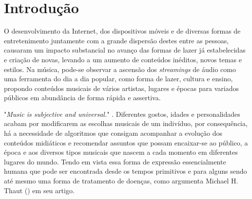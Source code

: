 \documentclass[12pt, %
openright, 
oneside, %
a4paper,    %
brazil]{facom-ufu-abntex2}
\begin{document}

\tableofcontents*
\cleardoublepage





\textual



\chapter[Introdução]{Introdução}


O desenvolvimento da Internet, dos dispositivos móveis e de diversas formas de entretenimento juntamente com a grande dispersão destes entre as pessoas, causaram um impacto substancial no avanço das formas de lazer já estabelecidas e criação de novas, levando a um aumento de conteúdos inéditos, novos temas e estilos. Na música, pode-se observar a ascensão dos \textit{streamings} de áudio como uma ferramenta do dia a dia popular, como forma de lazer, cultura e ensino, propondo conteúdos musicais de vários artistas, lugares e épocas  para variados públicos em abundância de forma rápida e assertiva.


"\textit{Music is subjective and universal.}" \cite{song2012survey}. Diferentes gostos, idades e personalidades acabam por modificarem as escolhas musicais de um indivíduo, por consequência, há a necessidade de algoritmos que consigam acompanhar a evolução dos conteúdos midiáticos e recomendar assuntos que possam encaixar-se ao público, a época e aos diversos tipos musicais que nascem a cada momento em diferentes lugares do mundo. Tendo em vista essa forma de expressão essencialmente humana que pode ser encontrada desde os tempos primitivos e para alguns sendo até mesmo uma forma de tratamento de doenças, como argumenta Michael H. Thaut (\citeyear{thaut2015music}) em seu artigo.
\end{document}

